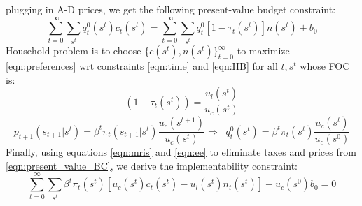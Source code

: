\documentclass{article} %
\begin{document}
plugging in A-D prices, we get the following present-value budget
constraint:
%
\begin{equation}
\sum_{t=0}^{\infty} \sum_{s^t} q_{t}^0(s^{t}) c_t(s^t) = \sum_{t=0}^{\infty} \sum_{s^t} q_{t}^0 [1 - \tau_t(s^t)]n(s^{t}) +  b_0 \label{eqn:present_value_BC}
\end{equation}
%
Household problem is to choose $\{c(s^t),n(s^t) \}_{t=0}^{\infty}$  to
maximize \ref{eqn:preferences} wrt constraints \ref{eqn:time} and \ref{eqn:HB} for all $t,s^t$ whose FOC is:
%
\begin{equation}
(1 - \tau_t(s^t)) = \frac{u_l(s^t)}{u_c(s^t)} \label{eqn:mris}
\end{equation}
%
\begin{equation}
p_{t+1}(s_{t+1}|s^t) = \beta^t \pi_t(s_{t+1}|s^t) \frac{u_c(s^{t+1})}{u_c(s^t)}  \Rightarrow 
\;\;q_{t}^0(s^t) = \beta^t \pi_t(s^t) \frac{u_c(s^{t})}{u_c(s^0)} \label{eqn:ee}
\end{equation}
%
Finally, using equations \ref{eqn:mris} and \ref{eqn:ee} to eliminate taxes and prices from \ref{eqn:present_value_BC}, we derive the implementability constraint:
%
\begin{equation}
\sum_{t=0}^{\infty} \sum_{s^t} \beta^t \pi_t(s^t)[u_c(s^t)c_t(s^t) - u_l(s^t)n_t(s^t)]  - u_c(s^0)b_0 = 0 \label{eqn:ic}
\end{equation}
% 
%
\end{document}

